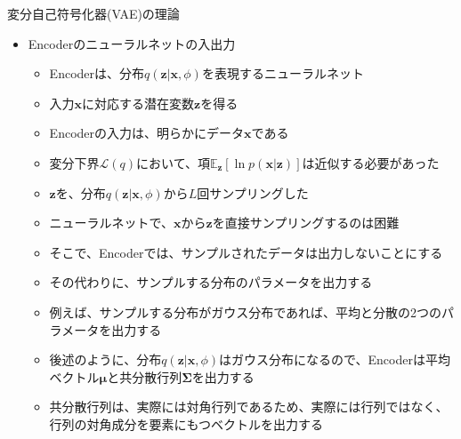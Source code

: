 \documentclass[dvipdfmx,notheorems,t]{beamer}
\begin{document}
\begin{frame}{変分自己符号化器(VAE)の理論}
	
\begin{itemize}
	\item Encoderのニューラルネットの入出力
	\begin{itemize}
		\item Encoderは、分布$q(\bm{z} | \bm{x}, \phi)$を表現するニューラルネット
		\item 入力$\bm{x}$に対応する潜在変数$\bm{z}$を得る
		\newline
		\item Encoderの入力は、明らかにデータ$\bm{x}$である
		\newline
		
		\item 変分下界$\mathcal{L}(q)$において、項$\mathbb{E}_{\bm{z}} \left[ \ln p(\bm{x} | \bm{z}) \right]$は近似する必要があった
		\item $\bm{z}$を、分布$q(\bm{z} | \bm{x}, \phi)$から$L$回サンプリングした
		\newline
		
		\item ニューラルネットで、$\bm{x}$から$\bm{z}$を\alert{直接サンプリングするのは困難}
		\item そこで、Encoderでは、サンプルされたデータは出力しないことにする
		\item その代わりに、サンプルする\alert{分布のパラメータを出力}する
		\newline
		\item 例えば、サンプルする分布が\alert{ガウス分布}であれば、\alert{平均}と\alert{分散}の2つのパラメータを出力する
		\newline
		\item 後述のように、分布$q(\bm{z} | \bm{x}, \phi)$は\alert{ガウス分布}になるので、Encoderは\alert{平均ベクトル}$\bm{\mu}$と\alert{共分散行列}$\bm{\Sigma}$を出力する
		\item 共分散行列は、実際には\alert{対角行列}であるため、実際には行列ではなく、\alert{行列の対角成分を要素にもつベクトル}を出力する
	\end{itemize}
\end{itemize}

\end{frame}
\end{document}
